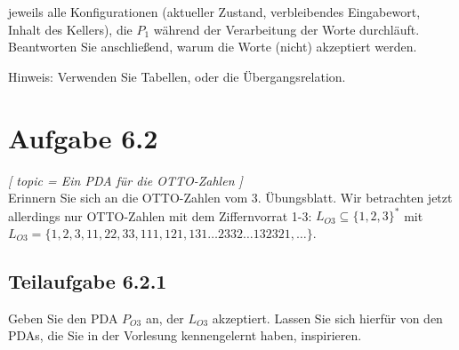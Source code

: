 \documentclass[12pt]{article}
\begin{document}
  
 jeweils alle Konfigurationen (aktueller Zustand, verbleibendes Eingabewort, Inhalt des Kellers), die $P_1$ während der Verarbeitung der Worte durchläuft. Beantworten Sie anschließend, warum die Worte (nicht) akzeptiert werden. 
  
 Hinweis: Verwenden Sie Tabellen, oder die Übergangsrelation. 
  
  \section*{Aufgabe 6.2}

\textit{  
[ 
 topic = Ein PDA für die OTTO-Zahlen 
 ] }\\
  
 Erinnern Sie sich an die OTTO-Zahlen vom 3. Übungsblatt. Wir betrachten jetzt allerdings nur OTTO-Zahlen mit dem Ziffernvorrat 1-3: $L_{O3} \subseteq \{1,2,3\}^*$ mit \\ $L_{O3} = \{1, 2, 3, 11, 22, 33, 111, 121, 131 \ldots 2332 \ldots 132321, \ldots \}$.  
  
 \subsection*{Teilaufgabe 6.2.1} 
 
  
 Geben Sie den PDA $P_{O3}$ an, der $L_{O3}$ akzeptiert. Lassen Sie sich hierfür von den PDAs, die Sie in der Vorlesung kennengelernt haben, inspirieren.  
  
\end{document}
